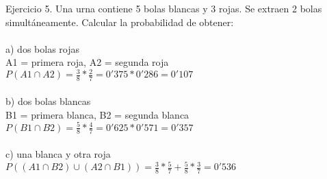 \documentclass{article}
\begin{document}
Ejercicio 5. Una urna contiene 5 bolas blancas y 3 rojas. Se extraen 2 bolas simultáneamente. Calcular la probabilidad de obtener: \\ \\
a) dos bolas rojas \\
A1 = primera roja, A2 = segunda roja \\
$P(A1 \cap A2) = \frac{3}{8} * \frac{2}{7} = 0'375*0'286 = 0'107$ \\ \\
b) dos bolas blancas \\ 
B1 = primera blanca, B2 = segunda blanca \\
$P(B1 \cap B2) =  \frac{5}{8} * \frac{4}{7} = 0'625 * 0'571 = 0'357$ \\ \\
c) una blanca y otra roja \\
$P((A1 \cap B2)\cup (A2 \cap B1)) = \frac{3}{8}*\frac{5}{7} + \frac{5}{8}*\frac{3}{7} = 0'536$ \\
\end{document}
